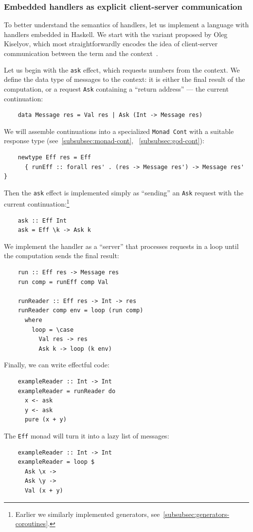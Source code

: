 \subsubsection{Embedded handlers as explicit client-server communication} \label{subsubsec:extensible-effects}

To better understand the semantics of handlers, let us implement a language with handlers embedded in Haskell.
We start with the variant proposed by Oleg Kiselyov, which most straightforwardly encodes the idea of client-server communication between the term and the context~\cite{kiselyov2013extensible}.

Let us begin with the \texttt{ask} effect, which requests numbers from the context.
We define the data type of messages to the context: it is either the final result of the computation, or a request \texttt{Ask} containing a ``return address'' --- the current continuation:
\begin{verbatim}
    data Message res = Val res | Ask (Int -> Message res)
\end{verbatim}

We will assemble continuations into a specialized \texttt{Monad Cont} with a suitable response type (see~\ref{subsubsec:monad-cont}, \ \ref{subsubsec:god-cont}):
\begin{verbatim}
    newtype Eff res = Eff
      { runEff :: forall res' . (res -> Message res') -> Message res' }
\end{verbatim}

Then the \texttt{ask} effect is implemented simply as ``sending'' an \texttt{Ask} request with the current continuation:\footnote{Earlier we similarly implemented generators, see\ \ref{subsubsec:generators-coroutines}.}
\begin{verbatim}
    ask :: Eff Int
    ask = Eff \k -> Ask k
\end{verbatim}

We implement the handler as a ``server'' that processes requests in a loop until the computation sends the final result:
\begin{verbatim}
    run :: Eff res -> Message res
    run comp = runEff comp Val

    runReader :: Eff res -> Int -> res
    runReader comp env = loop (run comp)
      where
        loop = \case
          Val res -> res
          Ask k -> loop (k env)
\end{verbatim}

Finally, we can write effectful code:
\begin{verbatim}
    exampleReader :: Int -> Int
    exampleReader = runReader do
      x <- ask
      y <- ask
      pure (x + y)
\end{verbatim}
The \texttt{Eff} monad will turn it into a lazy list of messages:
\begin{verbatim}
    exampleReader :: Int -> Int
    exampleReader = loop $
      Ask \x ->
      Ask \y ->
      Val (x + y)
\end{verbatim}


